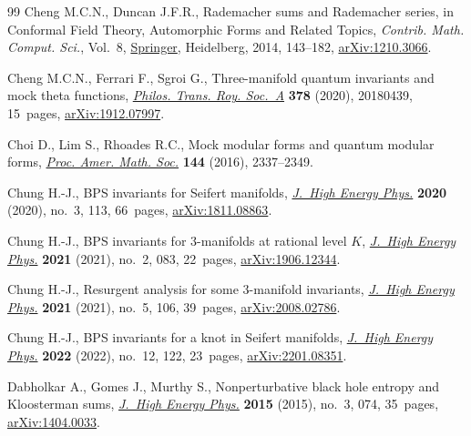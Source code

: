 \documentclass[10pt,a4paper]{amsart}
\theoremstyle{definition}
\numberwithin{equation}{section}
\begin{document}
\begin{thebibliography}{99}
Cheng M.C.N., Duncan J.F.R., Rademacher sums and {R}ademacher series, in
 Conformal {F}ield {T}heory, {A}utomorphic {F}orms and {R}elated {T}opics,
 \textit{Contrib. Math. Comput. Sci.}, Vol.~8, \href{https://doi.org/10.1007/978-3-662-43831-2_6}{Springer}, Heidelberg, 2014,
 143--182, \href{https://arxiv.org/abs/#2}{arXiv:1210.3066}.

Cheng M.C.N., Ferrari F., Sgroi G., Three-manifold quantum invariants and mock
 theta functions, \href{https://doi.org/10.1098/rsta.2018.0439}{\textit{Philos. Trans. Roy. Soc.~A}} \textbf{378} (2020),
 20180439, 15~pages, \href{https://arxiv.org/abs/1912.07997}{arXiv:1912.07997}.

Choi D., Lim S., Rhoades R.C., Mock modular forms and quantum modular forms,
 \href{https://doi.org/10.1090/proc/12907}{\textit{Proc. Amer. Math. Soc.}} \textbf{144} (2016), 2337--2349.

Chung H.-J., B{PS} invariants for {S}eifert manifolds, \href{https://doi.org/10.1007/jhep03(2020)113}{\textit{J.~High Energy
 Phys.}} \textbf{2020} (2020), no.~3, 113, 66~pages, \href{https://arxiv.org/abs/1811.08863}{arXiv:1811.08863}.

Chung H.-J., B{PS} invariants for 3-manifolds at rational level {$K$},
 \href{https://doi.org/10.1007/jhep02(2021)083}{\textit{J.~High Energy Phys.}} \textbf{2021} (2021), no.~2, 083, 22~pages,
 \href{https://arxiv.org/abs/1906.12344}{arXiv:1906.12344}.

Chung H.-J., Resurgent analysis for some 3-manifold invariants, \href{https://doi.org/10.1007/jhep05(2021)106}{\textit{J.~High
 Energy Phys.}} \textbf{2021} (2021), no.~5, 106, 39~pages,
 \href{https://arxiv.org/abs/2008.02786}{arXiv:2008.02786}.

Chung H.-J., B{PS} invariants for a knot in {S}eifert manifolds, \href{https://doi.org/10.1007/jhep12(2022)122}{\textit{J.~High
 Energy Phys.}} \textbf{2022} (2022), no.~12, 122, 23~pages,
 \href{https://arxiv.org/abs/2201.08351}{arXiv:2201.08351}.

Dabholkar A., Gomes J., Murthy S., Nonperturbative black hole entropy and
 {K}loosterman sums, \href{https://doi.org/10.1007/JHEP03(2015)074}{\textit{J.~High Energy Phys.}} \textbf{2015} (2015),
 no.~3, 074, 35~pages, \href{https://arxiv.org/abs/1404.0033}{arXiv:1404.0033}.


\end{thebibliography}
\end{document}
